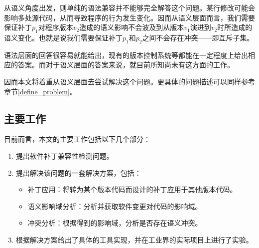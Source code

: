 从语义角度出发，则单纯的语法兼容并不能够完全解答这个问题。某行修改可能会影响多处源代码，从而导致程序的行为发生变化。因而从语义层面而言，我们需要保证补丁$p_1$对程序版本$v_2$造成的语义影响不会波及到从版本$v_1$演进到$v_2$时所造成的语义变化。也就是说我们需要保证补丁$p_1$和$p_2$之间不会存在冲突——即互斥子集。

语法层面的回答很容易就能给出，现有的版本控制系统等都能在一定程度上给出相应的答案。而对于语义层面的答案来说，就目前所知尚未有这方面的工作。

因而本文将着重从语义层面去尝试解决这个问题。更具体的问题描述可以同样参考章节\ref {define_problem}。


\subsection{主要工作}

目前而言，本文的主要工作包括以下几个部分：
\begin{enumerate}
	\item 提出软件补丁兼容性检测问题。
	\item 提出解决该问题的一套解决方案，包括：
	\begin{itemize}
		\item 补丁应用：将转为某个版本代码而设计的补丁应用于其他版本代码。
		\item 语义影响域分析：分析并获取软件变更对代码的影响域。
		\item 冲突分析：根据得到的影响域，分析是否存在语义冲突。
	\end{itemize}
	\item 根据解决方案给出了具体的工具实现，并在工业界的实际项目上进行了实验。
\end{enumerate}


%		
%		

